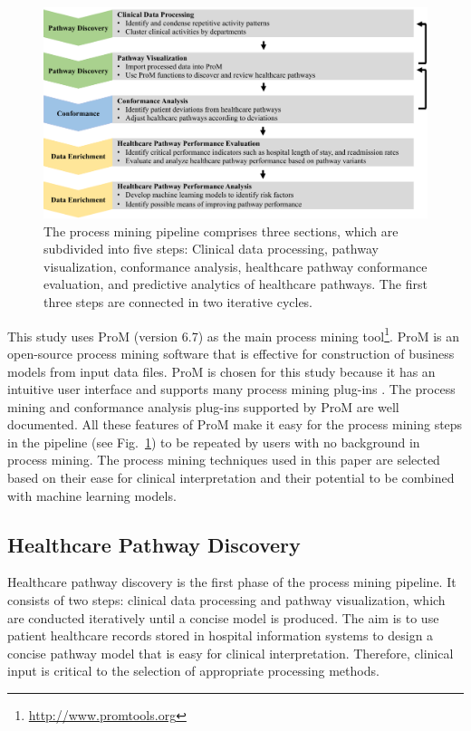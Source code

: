 \begin{figure}[t]
\centering
\includegraphics[width=\textwidth]{images/pipeline_diagram_journal.pdf}
\caption{The process mining pipeline comprises three sections, which
  are subdivided into five steps: Clinical data processing, pathway
  visualization, conformance analysis, healthcare pathway conformance
  evaluation, and predictive analytics of healthcare pathways. The
  first three steps are connected in two iterative cycles.}
\label{fig:pipeline}
\end{figure}

This study uses ProM (version 6.7) as the main process mining tool\footnote{\url{http://www.promtools.org}}. 
ProM is an open-source process mining software that is effective for construction of business models from input data files. ProM is chosen for this study because it has an intuitive user interface and supports many process mining plug-ins \cite{VanDongen2005}. The process mining and conformance analysis plug-ins supported by ProM are well documented. All these features of ProM make it easy for the process mining steps in the pipeline (see Fig.~\ref{fig:pipeline}) to be repeated by users with no background in process mining. The process mining techniques used in this paper are selected based on their ease for clinical interpretation and their potential to be combined with machine learning models. 

\subsection{Healthcare Pathway Discovery}
Healthcare pathway discovery is the first phase of the process mining pipeline. It consists of two steps: clinical data processing and pathway visualization, which are conducted iteratively until a concise model is produced.
The aim is to use patient healthcare records stored in hospital information systems to design a concise pathway model that is easy for clinical interpretation. Therefore, clinical input is critical to the selection of appropriate processing methods. 
 
